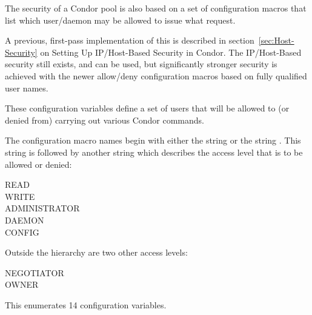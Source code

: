 The security of a Condor pool is also based on a set of configuration
macros that list which user/daemon may be allowed to issue what request.

A previous, first-pass implementation of this is described in
section~\ref{sec:Host-Security}
on Setting Up IP/Host-Based Security in Condor.
The IP/Host-Based security still exists, and can be used,
but significantly stronger security is achieved with the newer allow/deny 
configuration macros based on fully qualified user names.

These configuration variables define a set of users that will be
allowed to (or denied from) carrying out various Condor commands.


The configuration macro names
begin with either the string
 or the string .
This string is followed by another string which describes
the access level that is to be allowed or denied:
\begin{description}
    \item[READ]
    \item[WRITE]
    \item[ADMINISTRATOR]
    \item[DAEMON]
    \item[CONFIG]
\end{description}
Outside the hierarchy are two other access levels:
\begin{description}
    \item[NEGOTIATOR]
    \item[OWNER]
\end{description}
This enumerates 14 configuration variables.

